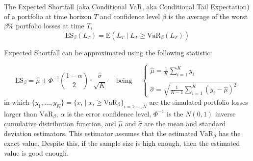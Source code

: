 \documentclass[11pt,fleqn]{book} %
\begin{document}
\begin{definition}
	The Expected Shortfall (aka Conditional VaR, aka Conditional Tail 
	Expectation) of a portfolio at time horizon $T$ and 
	confidence level $\beta$ is the average of the worst $\beta\%$ portfolio 
	losses at time $T$,
	\begin{displaymath}
		\text{ES}_\beta(L_T) = \text{E}(L_T \mid L_T \ge \text{VaR}_\beta(L_T))
	\end{displaymath}
\end{definition}

Expected Shortfall can be approximated using the following statistic:

\begin{displaymath}
	\text{ES}_{\beta} = \widehat{\mu} \pm \Phi^{-1}\left(\frac{1-\alpha}{2}\right) \cdot \frac{\widehat{\sigma}}{\sqrt{K}}
	\quad \text{ being } \quad
	\left\{
	\begin{array}{l}
		\displaystyle
		\widehat{\mu} = \frac{1}{K} \sum_{i=1}^{K} y_i \\
		\\
		\displaystyle
		\widehat{\sigma} =
		\sqrt{\frac{1}{K-1} \sum_{i=1}^{K} \left( y_i - \widehat{\mu} \right)^2}
	\end{array}
	\right.
\end{displaymath}
in which 
$\{y_1, \ldots, y_K\} = \{x_i \mid x_i \ge \text{VaR}_{\beta} \}_{i=1,\dots,N}$ 
are the simulated portfolio losses larger than $\text{VaR}_{\beta}$, 
$\alpha$ is the error confidence level, $\Phi^{-1}$ is the $N(0,1)$ 
inverse cumulative distribution function, and $\widehat{\mu}$ and 
$\widehat{\sigma}$ are the mean and standard deviation estimators.
This estimator assumes that the estimated $\text{VaR}_{\beta}$ has the 
exact value. Despite this, if the sample size is high enough, then the 
estimated value is good enough.
\end{document}
